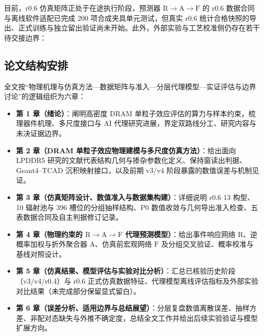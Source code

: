 目前，r0.6 仿真矩阵正处于在途执行阶段，预测器 $\mathrm{R}\to\mathrm{A}\to\mathrm{F}$ 的 r0.6 数据合同与离线软件适配已完成 200 项合成夹具单元测试，但真实 r0.6 统计合格快照的导出、正式训练与独立留出验证尚未开始。此外，外部实验与工艺校准侧仍存在若干待交接边界：


\subsection{论文结构安排}
全文按“物理机理与仿真方法—数据矩阵与准入—分层代理模型—实证评估与边界讨论”的逻辑组织为六章：
\begin{itemize}
  \item \textbf{第 1 章（绪论）}：阐明高密度 DRAM 单粒子效应评估的算力与样本约束，梳理器件机理、多尺度接口与 AI 代理研究进展，界定双路线分工、研究内容与未决证据边界。
  \item \textbf{第 2 章（DRAM 单粒子效应物理建模与多尺度仿真方法）}：给出面向 LPDDR5 研究的文献代表结构几何与掺杂参数化定义、保持窗读出判据、Geant4--TCAD 沉积映射接口，以及前期 v3/v4 阶段暴露的数值误差与机制见证。
  \item \textbf{第 3 章（仿真矩阵设计、数值准入与数据集构建）}：详细说明 r0.6 13 构型、10 辐射池与 396 槽位的分组抽样结构、P0 数值收敛与几何导出准入检查、五表数据合同及自主判据修订记录。
  \item \textbf{第 4 章（物理约束的 $\mathrm{R}\to\mathrm{A}\to\mathrm{F}$ 代理预测模型）}：给出事件响应网络 $\mathrm{R}$、逆概率加权与折外聚合器 $\mathrm{A}$、仿真前宏观网络 $\mathrm{F}$ 及分组交叉验证、概率校准与基线对照设计。
  \item \textbf{第 5 章（仿真结果、模型评估与实验对比分析）}：汇总已核验历史阶段（v3/v4/r0.4）与 r0.6 正式仿真数据特征、代理模型离线评估指标及外部实验对比结果（未完成部分保留显式留白）。
  \item \textbf{第 6 章（误差分析、适用边界与总结展望）}：分层复盘数值离散误差、抽样方差、非配对态缺失与外推不确定度，总结全文工作并给出后续实验验证与模型扩展方向。
\end{itemize}
